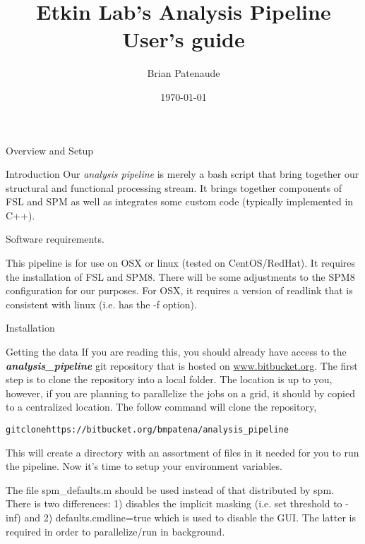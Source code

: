 \documentclass[]{report}
\begin{document}
\title{Etkin Lab's Analysis Pipeline User's guide}
\author{Brian Patenaude}
\date{\today}
\maketitle
\begin{chapter}{Overview and Setup}
\begin{section}{Introduction}
Our  {\it analysis pipeline} is merely a bash script that bring together our structural and functional processing stream. It brings together components of FSL and SPM as well as integrates some custom code (typically implemented in C++).  
\end{section}
\begin{section}{Software requirements.}

This pipeline is for use on OSX or linux (tested on CentOS/RedHat). It requires the installation of FSL and SPM8. There will be some adjustments to the SPM8 configuration for our purposes. For OSX, it requires a version of readlink that is consistent with linux (i.e. has the -f option).

\end{section}

\begin{section}{Installation}
\begin{subsection}{Getting the data}
If you are reading this, you should already have access to the {\bf \it analysis\_pipeline} git repository that is hosted on \url{www.bitbucket.org}. The first step is to clone the repository into a local folder. The location is up to you, however, if you are planning to parallelize the jobs on a grid, it should by copied to a centralized location. The follow command will clone the repository, 

\begin{alltt}
\hspace*{0.5in} 	git clone https://bitbucket.org/bmpatena/analysis_pipeline
\end{alltt}

This will create a directory with an assortment of files in it needed for you to run the pipeline. Now it's time to setup your environment variables.

The file spm\_defaults.m should be used instead of that distributed by spm. There is two differences: 1) disables the implicit masking (i.e. set threshold to -inf)  and 2) defaults.cmdline=true which is used to disable the GUI. The latter is required in order to parallelize/run in background.



\end{subsection}
\end{section}
\end{chapter}
\end{document}
